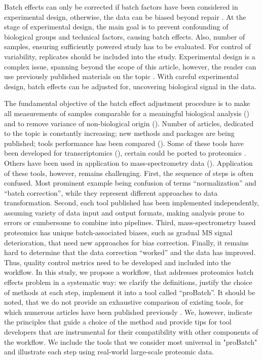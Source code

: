 \documentclass[num-refs]{wiley-article}
\begin{document}
Batch effects can only be corrected if batch factors have been considered in experimental design, otherwise, the data can be biased beyond repair  \cite{Hu2005, Gilad2015}. At the stage of experimental design, the main goal is to prevent confounding of biological groups and technical factors, causing batch effects. Also, number of samples, ensuring sufficiently powered study has to be evaluated. For control of variability, replicates should be included into the study. Experimental design is a complex issue, spanning beyond the scope of this article, however, the reader can use previously published materials on the topic \cite{Oberg2009, Cuklina2020}. With careful experimental design, batch effects can be adjusted for, uncovering biological signal in the data.

The fundamental objective of the batch effect adjustment procedure is to make all measurements of samples comparable for a meaningful biological analysis (\cite{Leek:2010aa}) and to remove variance of non-biological origin (\cite{Bolstad2003}). Number of articles, dedicated to the topic is constantly increasing; new methods and packages are being published; tools performance has been compared (\cite{Luo2010, Chen:2011ac, Dillies:2013aa, Chawade:2014aa}). Some of these tools have been developed for transcriptomics (\cite{Johnson:2007aa, Sims:2008aa, Leek:2007aa, Benito2004, Dillies:2013aa}), certain could be ported to proteomics \cite{Lee:2019aa}. Others have been used in application to mass-spectrometry data (\cite{Karpievitch2012, Chawade:2014aa, Valikangas2018, Gregori2012}). Application of these tools, however, remains challenging. First, the sequence of steps is often confused. Most prominent example being confusion of terms “normalization” and “batch correction”, while they represent different approaches to data transformation. Second, each tool published has been implemented independently, assuming variety of data input  and output formats, making analysis prone to errors or cumbersome to combine into pipelines. Third, mass-spectrometry based proteomics has unique batch-associated biases, such as gradual MS signal deterioration, that need new approaches for bias correction. Finally, it remains hard to determine that the data correction “worked” and the data has improved. Thus, quality control metrics need to be developed and included into the workflow. In this study, we propose a workflow, that addresses proteomics batch effects problem in a systematic way: we clarify the definitions, justify the choice of methods at each step, implement it into a tool called “proBatch”. It should be noted, that we do not provide an exhaustive comparison of existing tools, for which numerous articles have been published previously \cite{Lazar:2013aa, Chawade:2014aa, Cheng:2012aa}. We, however, indicate the principles that guide a choice of the method and provide tips for tool developers that are instrumental for their compatibility with other components of the workflow. We include the tools that we consider most universal in "proBatch" and illustrate each step using real-world large-scale proteomic data.
\end{document}
